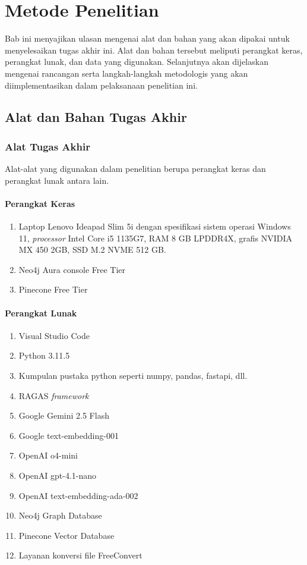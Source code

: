 \chapter{Metode Penelitian}

Bab ini menyajikan ulasan mengenai alat dan bahan yang akan dipakai untuk menyelesaikan tugas akhir ini.
Alat dan bahan tersebut meliputi perangkat keras, perangkat lunak, dan data yang digunakan.
Selanjutnya akan dijelaskan mengenai rancangan serta langkah-langkah metodologis yang akan diimplementasikan dalam pelaksanaan penelitian ini.

\section{Alat dan Bahan Tugas Akhir}

\subsection{Alat Tugas Akhir}
Alat-alat yang digunakan dalam penelitian berupa perangkat keras dan perangkat lunak antara lain.
\subsubsection{Perangkat Keras}
\begin{enumerate}
	\item Laptop Lenovo Ideapad Slim 5i dengan spesifikasi sistem operasi Windows 11, \textit{processor} Intel Core i5 1135G7, RAM 8 GB LPDDR4X, grafis NVIDIA MX 450 2GB, SSD M.2 NVME 512 GB.
	\item Neo4j Aura console Free Tier
	\item Pinecone Free Tier
\end{enumerate}

\subsubsection{Perangkat Lunak}
\begin{enumerate}
	\item Visual Studio Code
	\item Python 3.11.5
	\item Kumpulan pustaka python seperti numpy, pandas, fastapi, dll.
	\item RAGAS \textit{framework}
	\item Google Gemini 2.5 Flash
	\item Google text-embedding-001
	\item OpenAI o4-mini
	\item OpenAI gpt-4.1-nano
	\item OpenAI text-embedding-ada-002
	\item Neo4j Graph Database
	\item Pinecone Vector Database
	\item Layanan konversi file FreeConvert
\end{enumerate}

